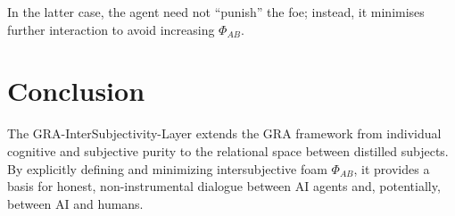 \documentclass[11pt,a4paper]{article}
\begin{document}
In the latter case, the agent need not ``punish'' the foe; instead, it
minimises further interaction to avoid increasing \(\Phi_{AB}\).

\section{Conclusion}

The GRA-InterSubjectivity-Layer extends the GRA framework from individual
cognitive and subjective purity to the relational space between distilled
subjects. By explicitly defining and minimizing intersubjective foam
\(\Phi_{AB}\), it provides a basis for honest, non-instrumental dialogue
between AI agents and, potentially, between AI and humans.
\end{document}
